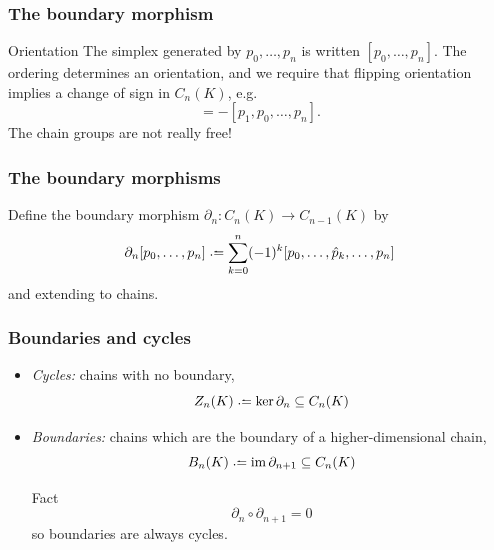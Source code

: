 \documentclass[xcolor=dvipsnames]{beamer}
\begin{document}
\begin{frame}
	\frametitle{The boundary morphism}
	\begin{block}{Orientation}
		The simplex generated by \( p_0, \dots, p_n \) is written \( [p_0, \dots, p_n] \). The
		ordering determines an orientation, and we require that flipping orientation implies a
		change of sign in \( C_n(K) \), e.g.
		\begin{equation*}
			[p_0, p_1, \dots, p_n] = -[p_1, p_0, \dots, p_n]. 
		\end{equation*}
		\pause
		The chain groups are not really free!
	\end{block}
\end{frame}

\begin{frame}
	\frametitle{The boundary morphisms}
	Define the boundary morphism \( \partial_n \colon C_n(K) \to C_{n-1}(K) \) by
	\begin{equation*}
		\partial_n [p_0, \dots, p_n] \defeq \sum_{k = 0}^{n} (-1)^k [p_0, \dots, \hat p_k,
		\dots, p_n]
	\end{equation*}
	and extending to chains. 
	\pause

\end{frame}	

\begin{frame}
	\frametitle{Boundaries and cycles}
	\begin{itemize}
		\item \emph{Cycles:} chains with no boundary,
			\begin{equation*}
				Z_n(K) \defeq \ker{\partial_n} \subseteq C_n(K)
			\end{equation*}
			\pause

		\item \emph{Boundaries:} chains which are the boundary of a higher-dimensional chain,
			\begin{equation*}
				B_n(K) \defeq \im{\partial_{n+1}} \subseteq C_n(K)
			\end{equation*}
		\pause

		\begin{block}{Fact}
			\begin{equation*}
				\partial_n \circ \partial_{n+1} = 0
			\end{equation*}
			so boundaries are always cycles. 
		\end{block}
			
	\end{itemize}
\end{frame}
\end{document}
